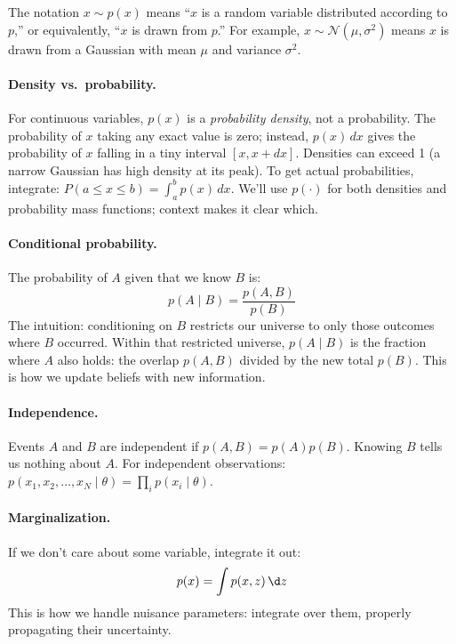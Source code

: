 \documentclass[11pt]{article}
\begin{document}
The notation $x \sim p(x)$ means ``$x$ is a random variable distributed according to $p$,'' or equivalently, ``$x$ is drawn from $p$.'' For example, $x \sim \mathcal{N}(\mu, \sigma^2)$ means $x$ is drawn from a Gaussian with mean $\mu$ and variance $\sigma^2$.

\paragraph{Density vs.\ probability.} For continuous variables, $p(x)$ is a \emph{probability density}, not a probability. The probability of $x$ taking any exact value is zero; instead, $p(x)\,dx$ gives the probability of $x$ falling in a tiny interval $[x, x+dx]$. Densities can exceed 1 (a narrow Gaussian has high density at its peak). To get actual probabilities, integrate: $P(a \le x \le b) = \int_a^b p(x)\,dx$. We'll use $p(\cdot)$ for both densities and probability mass functions; context makes it clear which.

\paragraph{Conditional probability.} The probability of $A$ given that we know $B$ is:
\begin{equation}
p(A \mid B) = \frac{p(A, B)}{p(B)}
\end{equation}
The intuition: conditioning on $B$ restricts our universe to only those outcomes where $B$ occurred. Within that restricted universe, $p(A \mid B)$ is the fraction where $A$ also holds: the overlap $p(A,B)$ divided by the new total $p(B)$.
This is how we update beliefs with new information.

\paragraph{Independence.} Events $A$ and $B$ are independent if $p(A, B) = p(A)p(B)$. Knowing $B$ tells us nothing about $A$. For independent observations: $p(x_1, x_2, \ldots, x_N \mid \theta) = \prod_i p(x_i \mid \theta)$.

\paragraph{Marginalization.} If we don't care about some variable, integrate it out:
\begin{equation}
p(x) = \int p(x, z)\, \d z
\end{equation}
This is how we handle nuisance parameters: integrate over them, properly propagating their uncertainty.
\end{document}
